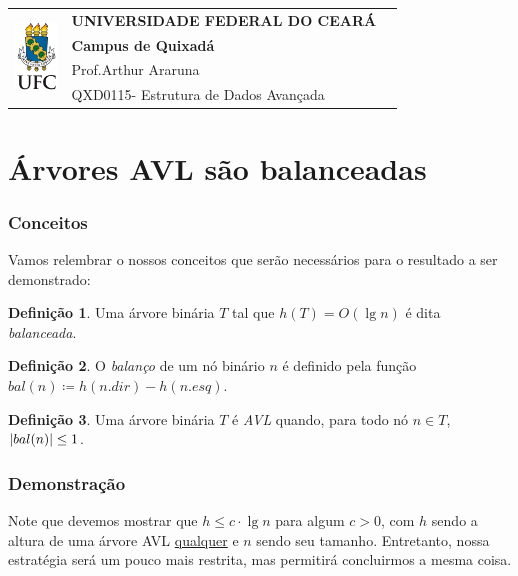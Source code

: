 \documentclass[10pt,a4paper,twoside]{article}
\DeclarePairedDelimiter{\abs}{\lvert}{\rvert}
\theoremstyle{definition}
\newtheorem{definition}{Definição}[section]
\def\disciplinacodigotext{QXD0115}
\def\disciplinanometext{Estrutura de Dados Avançada}
\def\provatitle{Árvores AVL são balanceadas}
\def\professorabbrv{Prof.}
\def\professornometext{Arthur Araruna}
\begin{document}
\noindent
\begin{minipage}{\textwidth}
	\begin{tabularx}{\textwidth}{cXc}
	\multirow{4}{*}{\includegraphics[height=1.8cm]{brasaoufc.pdf}} & {\bf UNIVERSIDADE FEDERAL DO CEARÁ} & \multirow{3}{*}{} \\
	& {\bf Campus de Quixadá} & \\
	& \professorabbrv\enspace\professornometext & \\
	& \disciplinacodigotext - \disciplinanometext & {} \\
	\end{tabularx}
\end{minipage}

\bigskip
\bigskip

\part*{\provatitle}
\section{Conceitos}

Vamos relembrar o nossos conceitos que serão necessários para o resultado a ser demonstrado:

\begin{definition}
    Uma árvore binária \( T \) tal que \( h(T) = O(\lg n) \) é dita \emph{balanceada}.
\end{definition}

\begin{definition}
    O \emph{balanço} de um nó binário \( n \) é definido pela função \( bal(n) \coloneqq h(n.dir) - h(n.esq) \).
\end{definition}

\begin{definition}
    Uma árvore binária \( T \) é \emph{AVL} quando, para todo nó \( n \in T \), \( \abs{bal(n)} \leq 1 \).
\end{definition}

\section{Demonstração}

Note que devemos mostrar que \( h \leq c \cdot \lg n \) para algum \( c > 0 \), com \( h \) sendo a altura de uma árvore AVL \ul{qualquer} e \( n \) sendo seu tamanho. Entretanto, nossa estratégia será um pouco mais restrita, mas permitirá concluirmos a mesma coisa.
\end{document}
